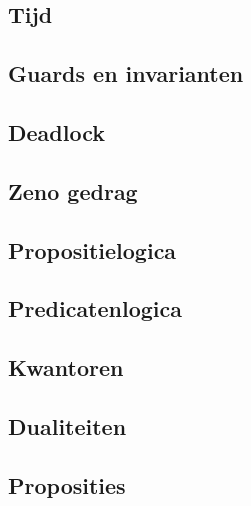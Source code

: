 \documentclass{article}
\begin{document}
	\subsection{Tijd}
	
	\subsection{Guards en invarianten}
	
	\subsection{Deadlock}
	
	\subsection{Zeno gedrag}
	
 
	
	\subsection{Propositielogica}
	
	\subsection{Predicatenlogica}
	
	\subsection{Kwantoren}
	
	\subsection{Dualiteiten}
	
	\subsection{Proposities}
	
\end{document}

